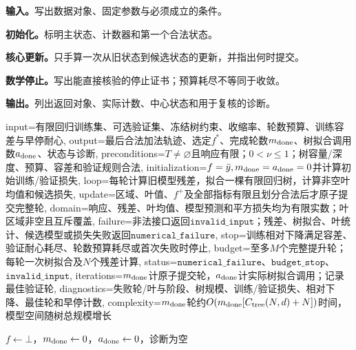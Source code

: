 
\begin{keypointbox}[title={平方损失回归提升树：五步阅读}]
\textbf{输入。}写出数据对象、固定参数与必须成立的条件。\par
\textbf{初始化。}标明主状态、计数器和第一个合法状态。\par
\textbf{核心更新。}只手算一次从旧状态到候选状态的更新，并指出何时提交。\par
\textbf{数学停止。}写出能直接核验的停止证书；预算耗尽不等同于收敛。\par
\textbf{输出。}列出返回对象、实际计数、中心状态和用于复核的诊断。
\end{keypointbox}

\begin{AlgorithmContract}{
  input={有限回归训练集、可选验证集、冻结树约束、收缩率、轮数预算、训练容差与早停耐心},
  output={最后合法加法轨迹、选定$f^*$、完成轮数$m_{\rm done}$、树拟合调用数$a_{\rm done}$、状态与诊断},
  preconditions={$T\ne\varnothing$且响应有限；$0<\nu\le1$；树容量/深度、预算、容差和验证规则合法},
  initialization={$f=\bar y,m_{\rm done}=a_{\rm done}=0$并计算初始训练/验证损失},
  loop={每轮计算旧模型残差，拟合一棵有限回归树，计算非空叶均值和候选损失},
  update={区域、叶值、$f^+$及全部指标有限且划分合法后才原子提交完整轮},
  domain={响应、残差、叶均值、模型预测和平方损失均为有限实数；叶区域非空且互斥覆盖},
  failure={非法接口返回$\mathtt{invalid\_input}$；残差、树拟合、叶统计、候选模型或损失失败返回$\mathtt{numerical\_failure}$},
  stop={训练相对下降满足容差、验证耐心耗尽、轮数预算耗尽或首次失败时停止},
  budget={至多$M$个完整提升轮；每轮一次树拟合及$N$个残差计算},
  status={$\mathtt{numerical\_failure}$、$\mathtt{budget\_stop}$、$\mathtt{invalid\_input}$},
  iterations={$m_{\rm done}$计原子提交轮，$a_{\rm done}$计实际树拟合调用；记录最佳验证轮},
  diagnostics={失败轮/叶与阶段、树规模、训练/验证损失、相对下降、最佳轮和早停计数},
  complexity={$m_{\rm done}$轮约$O(m_{\rm done}[C_{\rm tree}(N,d)+N])$时间，模型空间随树总规模增长}
}
\begin{algorithm}[H]
\caption{平方损失回归提升树}\label{alg:V3-C03-regression-tree-boost}
$f\leftarrow\bot$，$m_{\rm done}\leftarrow0$，$a_{\rm done}\leftarrow0$，诊断为空\;

\end{algorithm}
\end{AlgorithmContract}
